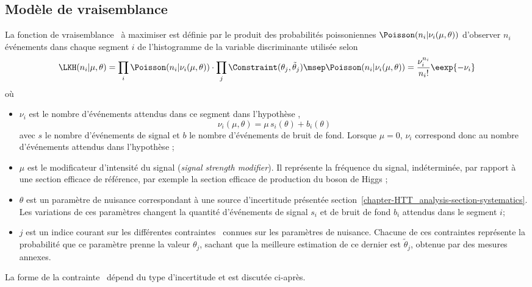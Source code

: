 \subsection{Modèle de vraisemblance}\label{chapter-HTT_analysis-section-signal_extraction-likelihood}
La fonction de vraisemblance \LKH\ à maximiser est définie par
le produit des probabilités poissoniennes $\Poisson (n_i | \nu_i(\mu,\theta))$ d'observer $n_i$ événements dans chaque segment $i$ de l'histogramme de la variable discriminante utilisée
selon
\begin{equation}
\LKH(n_i | \mu,\theta)
=
\prod_i \Poisson(n_i | \nu_i(\mu,\theta))
\cdot
\prod_j \Constraint(\theta_j, \tilde{\theta}_j)
\msep
\Poisson(n_i | \nu_i(\mu,\theta))
=
\frac{\nu_i^{n_i}}{{n_i}!}\eexp{-\nu_i}
\end{equation}
où
\begin{itemize}
\item $\nu_i$ est le nombre d'événements attendus dans ce segment dans l'hypothèse \hypSB, \ie
\begin{equation}
\nu_i(\mu,\theta) = \mu \, s_i(\theta) + b_i(\theta)
\end{equation}
avec
$s$ le nombre d'événements de signal
et
$b$ le nombre d'événements de bruit de fond.
Lorsque $\mu=0$, $\nu_i$ correspond donc au nombre d'événements attendus dans l'hypothèse \hypB;
\item $\mu$ est le modificateur d'intensité du signal (\emph{signal strength modifier}).
Il représente la fréquence du signal, indéterminée, par rapport à une section efficace de référence, par exemple la section efficace de production du boson de Higgs \higgs;
\item $\theta$ est un paramètre de nuisance correspondant à une source d'incertitude présentée section~\ref{chapter-HTT_analysis-section-systematics}.
Les variations de ces paramètres changent la quantité d'événements de signal $s_i$ et de bruit de fond $b_i$ attendus dans le segment $i$;
\item $j$ est un indice courant sur les différentes contraintes \Constraint\ connues sur les paramètres de nuisance.
Chacune de ces contraintes représente la probabilité que ce paramètre prenne la valeur $\theta_j$, sachant que la meilleure estimation de ce dernier est $\tilde{\theta}_j$, obtenue par des mesures annexes.
\end{itemize}
La forme de la contrainte \Constraint\ dépend du type d'incertitude et est discutée ci-après.
